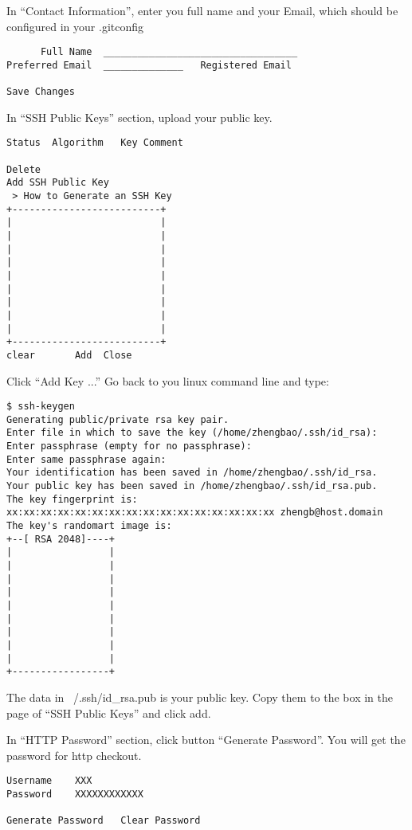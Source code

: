 \documentclass[titlepage,12pt]{article}
\begin{document}
{\label{Contact Information} In ``Contact Information'', enter you full name and your Email, which should be configured in your .gitconfig
{ \small
\begin{verbatim}
      Full Name  __________________________________
Preferred Email  ______________   Registered Email

Save Changes
\end{verbatim}
}

In ``SSH Public Keys'' section, upload your public key.
{ \small
\begin{verbatim}
Status  Algorithm   Key Comment

Delete
Add SSH Public Key
 > How to Generate an SSH Key
+--------------------------+
|                          |
|                          |
|                          |
|                          |
|                          |
|                          |
|                          |
|                          |
|                          |
+--------------------------+
clear       Add  Close
\end{verbatim}
}

Click ``Add Key ...''
Go back to you linux command line and type:
{ \small
\begin{verbatim}
$ ssh-keygen
Generating public/private rsa key pair.
Enter file in which to save the key (/home/zhengbao/.ssh/id_rsa):
Enter passphrase (empty for no passphrase):
Enter same passphrase again:
Your identification has been saved in /home/zhengbao/.ssh/id_rsa.
Your public key has been saved in /home/zhengbao/.ssh/id_rsa.pub.
The key fingerprint is:
xx:xx:xx:xx:xx:xx:xx:xx:xx:xx:xx:xx:xx:xx:xx:xx zhengb@host.domain
The key's randomart image is:
+--[ RSA 2048]----+
|                 |
|                 |
|                 |
|                 |
|                 |
|                 |
|                 |
|                 |
|                 |
+-----------------+
\end{verbatim}
}
The data in ~/.ssh/id\_rsa.pub is your public key. Copy them to the box in the page of ``SSH Public Keys'' and click add.

In ``HTTP Password'' section, click button ``Generate Password''. You will get the password for http checkout.
{ \small
\begin{verbatim}
Username    XXX
Password    XXXXXXXXXXXX

Generate Password   Clear Password

\end{verbatim}
}

}
\end{document}
